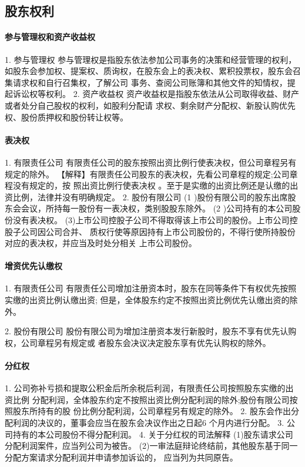 \documentclass[UTF8,12pt]{ctexart}
\numberwithin{equation}{section} %
\numberwithin{figure}{section}
\numberwithin{table}{section}
\begin{document}
	
	\subsection{股东权利}

	\paragraph{参与管理权和资产收益权}
	1. 参与管理权 参与管理权是指股东依法参加公司事务的决策和经营管理的权利，如股东会参加权、提案权、质询权，在股东会上的表决权、累积投票权，股东会召集请求权和自行召集权，了解公司 事务、查阅公司账簿和其他文件的知情权，提起诉讼权等权利。
	2. 资产收益权 资产收益权是指股东依法从公司取得收益、财产或者处分自己股权的权利，如股利分配请 求权、剩余财产分配权、新股认购优先权、股份质押权和股份转让权等。
	
	\paragraph{表决权}
	1. 有限责任公司 有限责任公司的股东按照出资比例行使表决权，但公司章程另有规定的除外。
	【解释】有限责任公司股东的表决权，先看公司章程的规定;公司章程没有规定的，按 照出资比例行使表决权 。至于是实缴的出资比例还是认缴的出资比例，法律并没有明确规定。
	2. 股份有限公司
	(1 )股份有限公司的股东出席股东会会议，所持每一股份有一表决权，类别股股东除外。 (2 )公司持有的本公司股份没有表决权。 (3)上市公司控股子公司不得取得该上市公司的股份。上市公司控股子公司因公司合并、 质权行使等原因持有上市公司股份的，不得行使所持股份对应的表决权，并应当及时处分相关 上市公司股份。
	
	
	\paragraph{增资优先认缴权}
	1. 有限责任公司 有限责任公司增加注册资本时，股东在同等条件下有权优先按照实缴的出资比例认缴出资; 但是，全体股东约定不按照出资比例优先认缴出资的除外。
	
	2. 股份有限公司 股份有限公司为增加注册资本发行新股时，股东不享有优先认购权，公司章程另有规定或 者股东会决议决定股东享有优先认购权的除外。
	
	\paragraph{分红权}
	1. 公司弥补亏损和提取公积金后所余税后利润，有限责任公司按照股东实缴的出资比例 分配利润，全体股东约定不按照出资比例分配利润的除外;股份有限公司按照股东所持有的股 份比例分配利润，公司章程另有规定的除外。
	2. 股东会作出分配利润的决议的，董事会应当在股东会决议作出之日起6 个月内进行分配。 3. 公司持有的本公司股份不得分配利润。
	4. 关于分红权的司法解释
	(1)股东请求公司分配利润案件，应当列公司为被告。 (2)一审法庭辩论终结前，其他股东基于同一分配方案请求分配利润并申请参加诉讼的， 应当列为共同原告。
	
\end{document}
